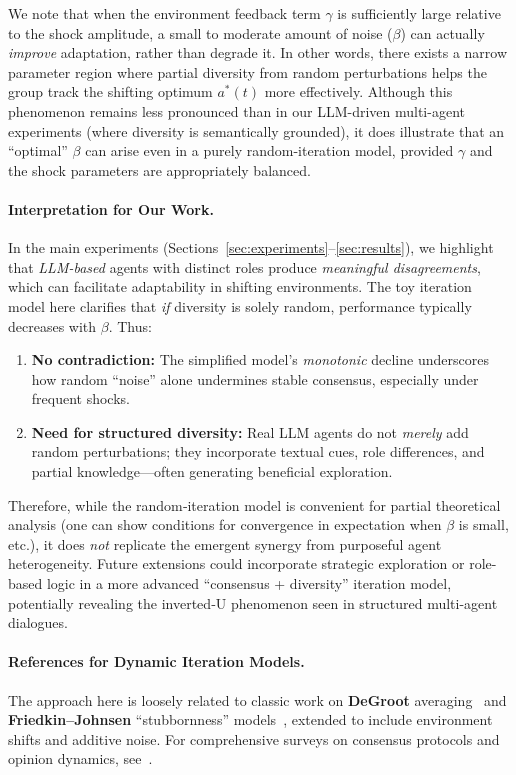 We note that when the environment feedback term $\gamma$ is sufficiently large relative to the shock amplitude, a small to moderate amount of noise ($\beta$) can actually \emph{improve} adaptation, rather than degrade it. In other words, there exists a narrow parameter region where partial diversity from random perturbations helps the group track the shifting optimum $a^*(t)$ more effectively. Although this phenomenon remains less pronounced than in our LLM-driven multi-agent experiments (where diversity is semantically grounded), it does illustrate that an ``optimal'' $\beta$ can arise even in a purely random-iteration model, provided $\gamma$ and the shock parameters are appropriately balanced.

\paragraph{Interpretation for Our Work.}
In the main experiments (Sections~\ref{sec:experiments}--\ref{sec:results}), we highlight that \emph{LLM-based} agents with distinct roles produce \emph{meaningful disagreements}, which can facilitate adaptability in shifting environments. The toy iteration model here clarifies that \emph{if} diversity is solely random, performance typically decreases with $\beta$. Thus:
\begin{enumerate}
    \item \textbf{No contradiction:} The simplified model’s \emph{monotonic} decline underscores how random “noise” alone undermines stable consensus, especially under frequent shocks.
    \item \textbf{Need for structured diversity:} Real LLM agents do not \emph{merely} add random perturbations; they incorporate textual cues, role differences, and partial knowledge—often generating beneficial exploration. 
\end{enumerate}
Therefore, while the random‐iteration model is convenient for partial theoretical analysis (one can show conditions for convergence in expectation when $\beta$ is small, etc.), it does \emph{not} replicate the emergent synergy from purposeful agent heterogeneity. Future extensions could incorporate strategic exploration or role-based logic in a more advanced “consensus + diversity” iteration model, potentially revealing the inverted‐U phenomenon seen in structured multi-agent dialogues.

\paragraph{References for Dynamic Iteration Models.}
The approach here is loosely related to classic work on \textbf{DeGroot} averaging~\cite{degroot1974reaching} and \textbf{Friedkin–Johnsen} “stubbornness” models~\cite{friedkin2011social}, extended to include environment shifts and additive noise. For comprehensive surveys on consensus protocols and opinion dynamics, see~\cite{olfati2007consensus, hegselmann2002opinion}.

